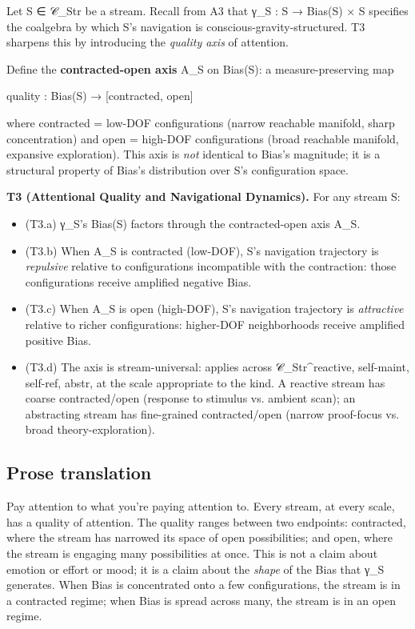 \documentclass[11pt, openany]{book}
\begin{document}
Let S ∈ 𝒞\_\allowbreak{}Str be a stream. Recall from A3 that γ\_\allowbreak{}S : S → Bias(S) × S specifies the coalgebra by which S's navigation is conscious-gravity-structured. T3 sharpens this by introducing the \textit{quality axis} of attention.

Define the \textbf{contracted-open axis} A\_\allowbreak{}S on Bias(S): a measure-preserving map

\begin{Code}
quality : Bias(S) → [contracted, open]
\end{Code}

where contracted = low-DOF configurations (narrow reachable manifold, sharp concentration) and open = high-DOF configurations (broad reachable manifold, expansive exploration). This axis is \textit{not} identical to Bias's magnitude; it is a structural property of Bias's distribution over S's configuration space.

\textbf{T3 (Attentional Quality and Navigational Dynamics).} For any stream S:

\begin{itemize}
\item (T3.a) γ\_\allowbreak{}S's Bias(S) factors through the contracted-open axis A\_\allowbreak{}S.
\item (T3.b) When A\_\allowbreak{}S is contracted (low-DOF), S's navigation trajectory is \textit{repulsive} relative to configurations incompatible with the contraction: those configurations receive amplified negative Bias.
\item (T3.c) When A\_\allowbreak{}S is open (high-DOF), S's navigation trajectory is \textit{attractive} relative to richer configurations: higher-DOF neighborhoods receive amplified positive Bias.
\item (T3.d) The axis is stream-universal: applies across 𝒞\_\allowbreak{}Str\textasciicircum{}reactive, self-maint, self-ref, abstr, at the scale appropriate to the kind. A reactive stream has coarse contracted/open (response to stimulus vs. ambient scan); an abstracting stream has fine-grained contracted/open (narrow proof-focus vs. broad theory-exploration).
\end{itemize}

\subsection{Prose translation}

Pay attention to what you're paying attention to. Every stream, at every scale, has a quality of attention. The quality ranges between two endpoints: contracted, where the stream has narrowed its space of open possibilities; and open, where the stream is engaging many possibilities at once. This is not a claim about emotion or effort or mood; it is a claim about the \textit{shape} of the Bias that γ\_\allowbreak{}S generates. When Bias is concentrated onto a few configurations, the stream is in a contracted regime; when Bias is spread across many, the stream is in an open regime.
\end{document}

